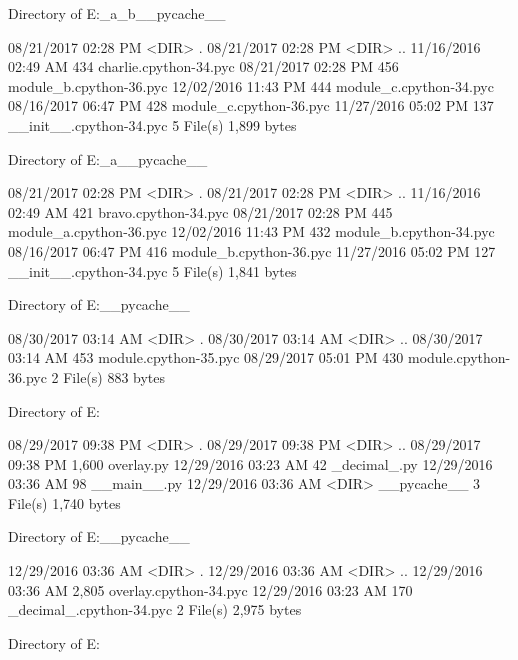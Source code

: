  Directory of E:\Python\apeman\mockup\simple\implicit_a\implicit_b\__pycache__

08/21/2017  02:28 PM    <DIR>          .
08/21/2017  02:28 PM    <DIR>          ..
11/16/2016  02:49 AM               434 charlie.cpython-34.pyc
08/21/2017  02:28 PM               456 module_b.cpython-36.pyc
12/02/2016  11:43 PM               444 module_c.cpython-34.pyc
08/16/2017  06:47 PM               428 module_c.cpython-36.pyc
11/27/2016  05:02 PM               137 __init__.cpython-34.pyc
               5 File(s)          1,899 bytes

 Directory of E:\Python\apeman\mockup\simple\implicit_a\__pycache__

08/21/2017  02:28 PM    <DIR>          .
08/21/2017  02:28 PM    <DIR>          ..
11/16/2016  02:49 AM               421 bravo.cpython-34.pyc
08/21/2017  02:28 PM               445 module_a.cpython-36.pyc
12/02/2016  11:43 PM               432 module_b.cpython-34.pyc
08/16/2017  06:47 PM               416 module_b.cpython-36.pyc
11/27/2016  05:02 PM               127 __init__.cpython-34.pyc
               5 File(s)          1,841 bytes

 Directory of E:\Python\apeman\mockup\__pycache__

08/30/2017  03:14 AM    <DIR>          .
08/30/2017  03:14 AM    <DIR>          ..
08/30/2017  03:14 AM               453 module.cpython-35.pyc
08/29/2017  05:01 PM               430 module.cpython-36.pyc
               2 File(s)            883 bytes

 Directory of E:\Python\apeman\simple

08/29/2017  09:38 PM    <DIR>          .
08/29/2017  09:38 PM    <DIR>          ..
08/29/2017  09:38 PM             1,600 overlay.py
12/29/2016  03:23 AM                42 _decimal_.py
12/29/2016  03:36 AM                98 __main__.py
12/29/2016  03:36 AM    <DIR>          __pycache__
               3 File(s)          1,740 bytes

 Directory of E:\Python\apeman\simple\__pycache__

12/29/2016  03:36 AM    <DIR>          .
12/29/2016  03:36 AM    <DIR>          ..
12/29/2016  03:36 AM             2,805 overlay.cpython-34.pyc
12/29/2016  03:23 AM               170 _decimal_.cpython-34.pyc
               2 File(s)          2,975 bytes

 Directory of E:\Python\apeman\tests

